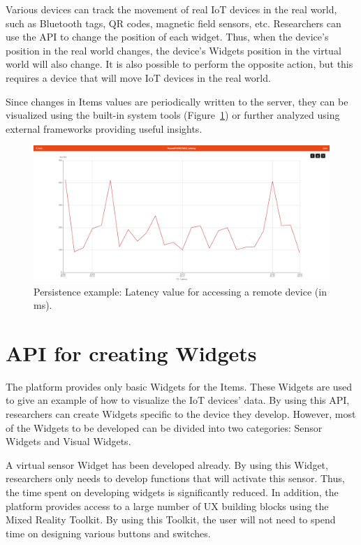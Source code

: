 Various devices can track the movement of real IoT devices in the real world, such as Bluetooth tags, QR codes, magnetic field sensors, etc. Researchers can use the API to change the position of each widget. Thus, when the device's position in the real world changes, the device's Widgets position in the virtual world will also change. It is also possible to perform the opposite action, but this requires a device that will move IoT devices in the real world.

Since changes in Items values are periodically written to the server, they can be visualized using the built-in system tools (Figure~\ref{fig:PersistenceExample-figure}) or further analyzed using external frameworks providing useful insights.

\begin{figure}
  \centering
  \includegraphics[width=0.9\linewidth]{figures/PersistenceExample.png}
  \caption{Persistence example: Latency value for accessing a remote device (in ms). }
  \label{fig:PersistenceExample-figure}
\end{figure}

\section{API for creating Widgets}

The platform provides only basic Widgets for the Items. These Widgets are used to give an example of how to visualize the IoT devices' data. By using this API, researchers can create Widgets specific to the device they develop. However, most of the Widgets to be developed can be divided into two categories: Sensor Widgets and Visual Widgets.

A virtual sensor Widget has been developed already. By using this Widget, researchers only needs to develop functions that will activate this sensor. Thus, the time spent on developing widgets is significantly reduced. In addition, the platform provides access to a large number of UX building blocks using the Mixed Reality Toolkit. By using this Toolkit, the user will not need to spend time on designing various buttons and switches. 



